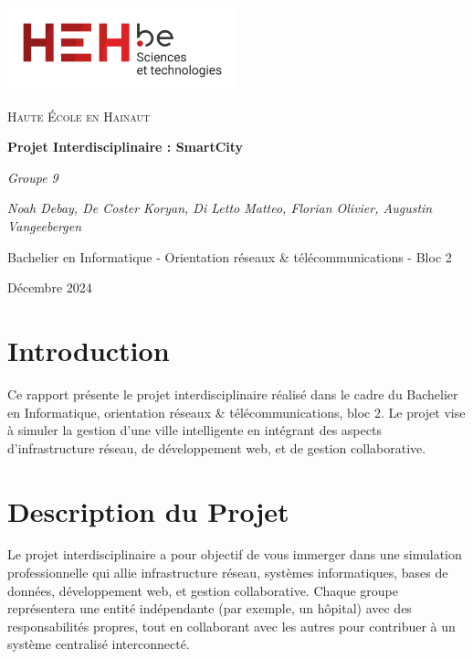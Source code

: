 \documentclass[a4paper,12pt]{report}
\begin{document}
\begin{titlepage}
    \centering
    \includegraphics[width=0.5\textwidth]{logo_heh.png}\par\vspace{1cm}
    {\scshape\LARGE Haute École en Hainaut \par}
    \vspace{1cm}
    {\huge\bfseries Projet Interdisciplinaire : SmartCity \par}
    \vspace{2cm}
    {\Large\itshape Groupe 9 \par}
    \vspace{1cm}
    {\Large\itshape Noah Debay, De Coster Koryan, Di Letto Matteo, Florian Olivier, Augustin Vangeebergen \par}
    \vfill
    {\large Bachelier en Informatique - Orientation réseaux \& télécommunications - Bloc 2 \par}
    \vfill
    {\large Décembre 2024 \par}
\end{titlepage}

\tableofcontents
\newpage

\chapter{Introduction}
Ce rapport présente le projet interdisciplinaire réalisé dans le cadre du Bachelier en Informatique, orientation réseaux \& télécommunications, bloc 2. Le projet vise à simuler la gestion d'une ville intelligente en intégrant des aspects d'infrastructure réseau, de développement web, et de gestion collaborative.

\chapter{Description du Projet}
Le projet interdisciplinaire a pour objectif de vous immerger dans une simulation professionnelle qui allie infrastructure réseau, systèmes informatiques, bases de données, développement web, et gestion collaborative. Chaque groupe représentera une entité indépendante (par exemple, un hôpital) avec des responsabilités propres, tout en collaborant avec les autres pour contribuer à un système centralisé interconnecté.
\end{document}
